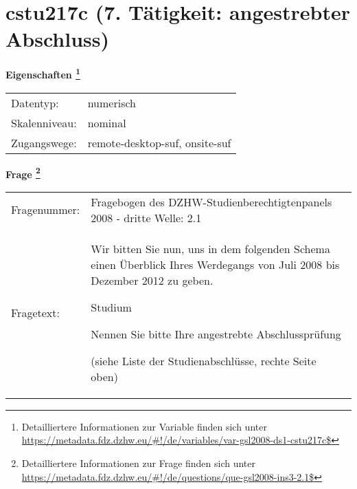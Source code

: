 
    \setcounter{footnote}{0}

    \vspace*{-1.8cm}
	\section{cstu217c (7. Tätigkeit: angestrebter Abschluss)}
	\label{section:cstu217c}



    \vspace*{0.5cm}
    \noindent\textbf{Eigenschaften
	\footnote{Detailliertere Informationen zur Variable finden sich unter
		\url{https://metadata.fdz.dzhw.eu/\#!/de/variables/var-gsl2008-ds1-cstu217c$}}}\\
	\begin{tabularx}{\hsize}{@{}lX}
	Datentyp: & numerisch \\
	Skalenniveau: & nominal \\
	Zugangswege: &
	  remote-desktop-suf, 
	  onsite-suf
 \\
    \end{tabularx}



				\vspace*{0.5cm}
                \noindent\textbf{Frage
	                \footnote{Detailliertere Informationen zur Frage finden sich unter
		              \url{https://metadata.fdz.dzhw.eu/\#!/de/questions/que-gsl2008-ins3-2.1$}}}\\
				\begin{tabularx}{\hsize}{@{}lX}
					Fragenummer: &
					  Fragebogen des DZHW-Studienberechtigtenpanels 2008 - dritte Welle:
					  2.1
 \\
					Fragetext: & Wir bitten Sie nun, uns in dem folgenden Schema einen Überblick Ihres Werdegangs von Juli 2008 bis Dezember 2012 zu geben.\par  Studium\par  Nennen Sie bitte Ihre angestrebte Abschlussprüfung \par  (siehe Liste der Studienabschlüsse, rechte Seite oben) \\
				\end{tabularx}





